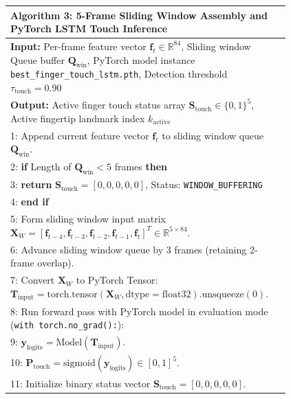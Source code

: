 \begin{figure}[htbp]
\centering
\begin{minipage}{0.92\textwidth}
\small
\setlength{\extrarowheight}{2pt}
\begin{tabular}{|p{0.96\linewidth}|}
\hline
\textbf{Algorithm 3: 5-Frame Sliding Window Assembly and PyTorch LSTM Touch Inference} \\
\hline
{\small\sffamily \textbf{Input:} Per-frame feature vector $\mathbf{f}_t \in \mathbb{R}^{84}$, Sliding window Queue buffer $\mathbf{Q}_{\text{win}}$, PyTorch model instance \texttt{best\allowbreak\_finger\allowbreak\_touch\allowbreak\_lstm.pth}, Detection threshold $\tau_{\text{touch}} = 0.90$} \\
{\small\sffamily \textbf{Output:} Active finger touch status array $\mathbf{S}_{\text{touch}} \in \{0, 1\}^5$, Active fingertip landmark index $k_{\text{active}}$} \\
{\small 1: Append current feature vector $\mathbf{f}_t$ to sliding window queue $\mathbf{Q}_{\text{win}}$.} \\
{\small 2: \textbf{if} Length of $\mathbf{Q}_{\text{win}} < 5$ frames \textbf{then}} \\
{\small 3: \hspace{1em} \textbf{return} $\mathbf{S}_{\text{touch}} = [0,0,0,0,0]$, Status: \texttt{WINDOW\_BUFFERING}} \\
{\small 4: \textbf{end if}} \\
{\small 5: Form sliding window input matrix $\mathbf{X}_W = [\mathbf{f}_{t-4}, \mathbf{f}_{t-3}, \mathbf{f}_{t-2}, \mathbf{f}_{t-1}, \mathbf{f}_t]^T \in \mathbb{R}^{5 \times 84}$.} \\
{\small 6: Advance sliding window queue by 3 frames (retaining 2-frame overlap).} \\
{\small 7: Convert $\mathbf{X}_W$ to PyTorch Tensor: $\mathbf{T}_{\text{input}} = \text{torch.tensor}(\mathbf{X}_W, \text{dtype}=\text{float32}).\text{unsqueeze}(0)$.} \\
{\small 8: Run forward pass with PyTorch model in evaluation mode (\texttt{with torch.no\_grad():}):} \\
{\small 9: \hspace{1em} $\mathbf{y}_{\text{logits}} = \text{Model}(\mathbf{T}_{\text{input}})$.} \\
{\small 10: \hspace{1em} $\mathbf{P}_{\text{touch}} = \text{sigmoid}(\mathbf{y}_{\text{logits}}) \in [0, 1]^5$.} \\
{\small 11: Initialize binary status vector $\mathbf{S}_{\text{touch}} = [0, 0, 0, 0, 0]$.} \\

\end{tabular}
\end{minipage}
\end{figure}
